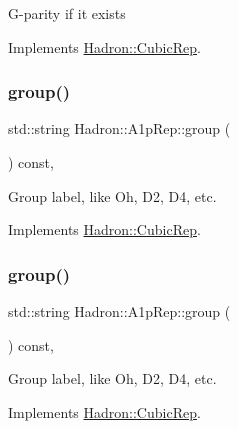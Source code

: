 G-\/parity if it exists 

Implements \mbox{\hyperlink{structHadron_1_1CubicRep_a52104e43266d1614c00bbd1c3b395458}{Hadron\+::\+Cubic\+Rep}}.

\mbox{\label{structHadron_1_1A1pRep_ae6ce3057cbe0aae60a3816c69f3a6dd9}} 
\subsubsection{\texorpdfstring{group()}{group()}\hspace{0.1cm}{\footnotesize\ttfamily [1/3]}}
{\footnotesize\ttfamily std\+::string Hadron\+::\+A1p\+Rep\+::group (\begin{DoxyParamCaption}{ }\end{DoxyParamCaption}) const\hspace{0.3cm}{\ttfamily [inline]}, {\ttfamily [virtual]}}

Group label, like Oh, D2, D4, etc. 

Implements \mbox{\hyperlink{structHadron_1_1CubicRep_a0748f11ec87f387062c8e8981339a29c}{Hadron\+::\+Cubic\+Rep}}.

\mbox{\label{structHadron_1_1A1pRep_ae6ce3057cbe0aae60a3816c69f3a6dd9}} 
\subsubsection{\texorpdfstring{group()}{group()}\hspace{0.1cm}{\footnotesize\ttfamily [2/3]}}
{\footnotesize\ttfamily std\+::string Hadron\+::\+A1p\+Rep\+::group (\begin{DoxyParamCaption}{ }\end{DoxyParamCaption}) const\hspace{0.3cm}{\ttfamily [inline]}, {\ttfamily [virtual]}}

Group label, like Oh, D2, D4, etc. 

Implements \mbox{\hyperlink{structHadron_1_1CubicRep_a0748f11ec87f387062c8e8981339a29c}{Hadron\+::\+Cubic\+Rep}}.

\mbox{\label{structHadron_1_1A1pRep_ae6ce3057cbe0aae60a3816c69f3a6dd9}} 
